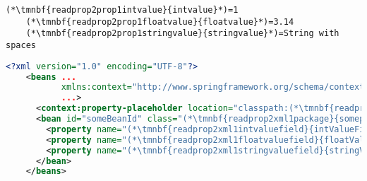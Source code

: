 \newpage

\emtwen
{}%
\begin{lstlisting}[title={A \textit{properties} file called \tmnbf{readprop2prop1filename}{\textit{setters.properties}}}]
    (*\tmnbf{readprop2prop1intvalue}{intvalue}*)=1
    (*\tmnbf{readprop2prop1floatvalue}{floatvalue}*)=3.14
    (*\tmnbf{readprop2prop1stringvalue}{stringvalue}*)=String with spaces
\end{lstlisting}
\begin{lstlisting}[language=XML, title={Configuration XML}]
    <?xml version="1.0" encoding="UTF-8"?>
    <beans ...
           xmlns:context="http://www.springframework.org/schema/context"
           ...>
      <context:property-placeholder location="classpath:(*\tmnbf{readprop2xml1filename}{setter.properties}[ForestGreen]*)" file-encoding="utf-8"/>
      <bean id="someBeanId" class="(*\tmnbf{readprop2xml1package}{somepackage.subpackage}[ForestGreen]*).(*\tmnbf{readprop2xml1class}{WantedClass}[ForestGreen]*)">
        <property name="(*\tmnbf{readprop2xml1intvaluefield}{intValueField}[ForestGreen]*)" value="(*\Sc*){(*\tmnbf{readprop2xml1intvalue}{intvalue}[ForestGreen]*)}"/>
        <property name="(*\tmnbf{readprop2xml1floatvaluefield}{floatValueField}[ForestGreen]*)" value="(*\Sc*){(*\tmnbf{readprop2xml1floatvalue}{floatvalue}[ForestGreen]*)}"/>
        <property name="(*\tmnbf{readprop2xml1stringvaluefield}{stringValueField}[ForestGreen]*)" value="(*\Sc*){(*\tmnbf{readprop2xml1stringvalue}{stringvalue}[ForestGreen]*)}"/>
      </bean>
    </beans>
\end{lstlisting}
